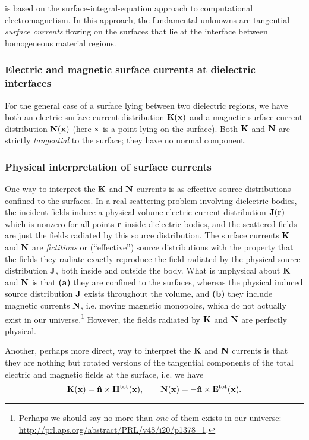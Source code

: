 \lss is based on the surface-integral-equation approach
to computational electromagnetism. In this approach, the
fundamental unknowns are tangential \textit{surface
currents} flowing on the surfaces that lie at the 
interface between homogeneous material regions.

\subsubsection*{Electric and magnetic surface currents at dielectric 
                interfaces}
For the general case of a surface lying between two
dielectric regions, we have both an electric 
surface-current distribution $\mathbf{K}(\mathbf{x})$ and a 
magnetic surface-current distribution $\mathbf{N}(\mathbf{x})$
(here $\mathbf{x}$ is a point lying on the surface).
Both $\mathbf{K}$ and $\mathbf{N}$ are strictly \textit{tangential}
to the surface; they have no normal component.

\subsubsection*{Physical interpretation of surface currents}

One way to interpret the $\mathbf{K}$ and $\mathbf{N}$ currents
is as effective source distributions confined to the surfaces. 
In a real scattering problem involving dielectric bodies, the 
incident fields induce a physical volume electric current 
distribution $\mathbf{J}(\mathbf{r})$ which is nonzero for all points 
$\mathbf{r}$ inside dielectric bodies, and the scattered fields 
are just the fields radiated by this source distribution.
The surface currents $\mathbf{K}$ and $\mathbf{N}$ are \textit{fictitious}
or (``effective'') source distributions with the property 
that the fields they radiate exactly reproduce the 
field radiated by the physical source distribution $\mathbf{J}$,
both inside and outside the body. What is unphysical about 
$\mathbf{K}$ and $\mathbf{N}$ is that \textbf{(a)} they are confined to 
the surfaces, whereas the physical induced source distribution
$\mathbf{J}$ exists throughout the volume, and \textbf{(b)} they
include magnetic currents $\mathbf{N}$, i.e. moving magnetic monopoles,
which do not actually exist in our universe.\footnote{Perhaps
we should say no more than \textit{one} of them exists in our 
universe: \url{http://prl.aps.org/abstract/PRL/v48/i20/p1378_1}.}
However, the fields radiated by $\mathbf{K}$ and $\mathbf{N}$ are 
perfectly physical.

Another, perhaps more direct, way to interpret the 
$\mathbf{K}$ and $\mathbf{N}$ currents is that they are nothing 
but rotated versions of the tangential components of 
the total electric and magnetic fields at the 
surface, i.e. we have 
$$ \mathbf{K}(\mathbf{x}) = \mathbf{\hat n}\times \mathbf{H}^{\hbox{\scriptsize{tot}}}(\mathbf{x}), 
   \qquad 
   \mathbf{N}(\mathbf{x}) =-\mathbf{\hat n}\times \mathbf{E}^{\hbox{\scriptsize{tot}}}(\mathbf{x}).
$$

